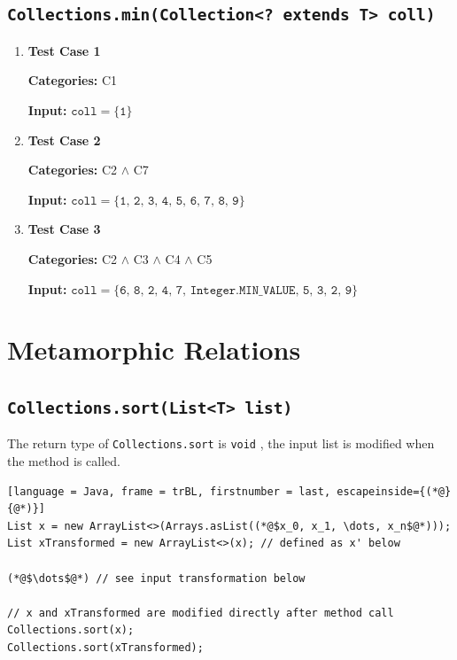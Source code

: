 \documentclass[12pt, a4paper]{article}
\begin{document}
\subsection{\texttt{Collections.min(Collection<? extends T> coll)}}
\begin{enumerate}
  \item \textbf{Test Case 1}
  \par\quad\textbf{Categories:} C1
  \par\quad\textbf{Input:} $\texttt{coll} = \{\texttt{1}\}$

  \item \textbf{Test Case 2}
  \par\quad\textbf{Categories:} C2 $\wedge$ C7
  \par\quad\textbf{Input:} $\texttt{coll} = \{\texttt{1, 2, 3, 4, 5, 6, 7, 8, 9}\}$

  \item \textbf{Test Case 3}
  \par\quad\textbf{Categories:} C2 $\wedge$ C3 $\wedge$ C4 $\wedge$ C5

  \par\quad\textbf{Input:} $\texttt{coll} = \{\texttt{6, 8, 2, 4, 7, Integer.MIN\_VALUE, 5, 3, 2,
  9}\}$
\end{enumerate}

\section{Metamorphic Relations}
\subsection{\texttt{Collections.sort(List<T> list)}}
The return type of \texttt{Collections.sort} is \texttt{void} \cite{collection_sort}, the input list
is modified when the method is called.

\begin{lstlisting}[language = Java, frame = trBL, firstnumber = last, escapeinside={(*@}{@*)}]
List x = new ArrayList<>(Arrays.asList((*@$x_0, x_1, \dots, x_n$@*)));
List xTransformed = new ArrayList<>(x); // defined as x' below

(*@$\dots$@*) // see input transformation below

// x and xTransformed are modified directly after method call
Collections.sort(x);
Collections.sort(xTransformed);
\end{lstlisting}
\end{document}
